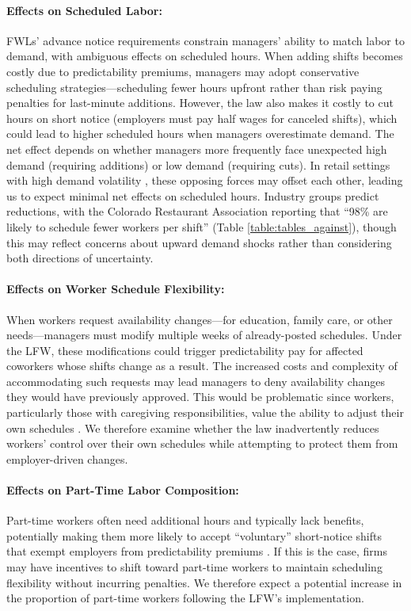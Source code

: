 \documentclass[letterpaper,11pt,leqno]{article}
\theoremstyle{paper}
\begin{document}
\paragraph{Effects on Scheduled Labor:}
FWLs' advance notice requirements constrain managers' ability to match labor to demand, with ambiguous effects on scheduled hours. When adding shifts becomes costly due to predictability premiums, managers may adopt conservative scheduling strategies—scheduling fewer hours upfront rather than risk paying penalties for last-minute additions. However, the law also makes it costly to cut hours on short notice (employers must pay half wages for canceled shifts), which could lead to higher scheduled hours when managers overestimate demand. The net effect depends on whether managers more frequently face unexpected high demand (requiring additions) or low demand (requiring cuts). In retail settings with high demand volatility \citep{netessine_traffic,kesavan_traffic,fisher_2021,retailAIScheduling2025}, these opposing forces may offset each other, leading us to expect minimal net effects on scheduled hours. Industry groups predict reductions, with the Colorado Restaurant Association reporting that ``98\% are likely to schedule fewer workers per shift'' (Table \ref{table:tables_against}), though this may reflect concerns about upward demand shocks rather than considering both directions of uncertainty.


\paragraph{Effects on Worker Schedule Flexibility:}
When workers request availability changes—for education, family care, or other needs—managers must modify multiple weeks of already-posted schedules. Under the LFW, these modifications could trigger predictability pay for affected coworkers whose shifts change as a result. The increased costs and complexity of accommodating such requests may lead managers to deny availability changes they would have previously approved. This would be problematic since workers, particularly those with caregiving responsibilities, value the ability to adjust their own schedules \citep{kelly2011changing,harknett2022who,mas2017valuing}. We therefore examine whether the law inadvertently reduces workers' control over their own schedules while attempting to protect them from employer-driven changes.

\paragraph{Effects on Part-Time Labor Composition:}
Part-time workers often need additional hours and typically lack benefits, potentially making them more likely to accept ``voluntary'' short-notice shifts that exempt employers from predictability premiums \citep{kalleberg2009precarious,lambert_2008}. If this is the case, firms may have incentives to shift toward part-time workers to maintain scheduling flexibility without incurring penalties. We therefore expect a potential increase in the proportion of part-time workers following the LFW's implementation. 
\end{document}
